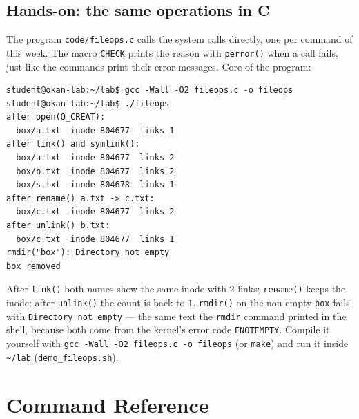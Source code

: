 \documentclass[11pt,a4paper]{article}
\newcommand{\cmd}[1]{\texttt{#1}}
\begin{document}
\subsection{Hands-on: the same operations in C}

The program \cmd{code/fileops.c} calls the system calls directly, one per command of this week. The macro \texttt{CHECK} prints the reason with \cmd{perror()} when a call fails, just like the commands print their error messages. Core of the program:



\begin{lstlisting}[style=term]
student@okan-lab:~/lab$ gcc -Wall -O2 fileops.c -o fileops
student@okan-lab:~/lab$ ./fileops
after open(O_CREAT):
  box/a.txt  inode 804677  links 1
after link() and symlink():
  box/a.txt  inode 804677  links 2
  box/b.txt  inode 804677  links 2
  box/s.txt  inode 804678  links 1
after rename() a.txt -> c.txt:
  box/c.txt  inode 804677  links 2
after unlink() b.txt:
  box/c.txt  inode 804677  links 1
rmdir("box"): Directory not empty
box removed
\end{lstlisting}

After \cmd{link()} both names show the same inode with $2$ links; \cmd{rename()} keeps the inode; after \cmd{unlink()} the count is back to $1$. \cmd{rmdir()} on the non-empty \texttt{box} fails with \texttt{Directory not empty} --- the same text the \cmd{rmdir} command printed in the shell, because both come from the kernel's error code \texttt{ENOTEMPTY}. Compile it yourself with \cmd{gcc -Wall -O2 fileops.c -o fileops} (or \cmd{make}) and run it inside \texttt{\textasciitilde/lab} (\cmd{demo\_fileops.sh}).

\section{Command Reference}
\end{document}
